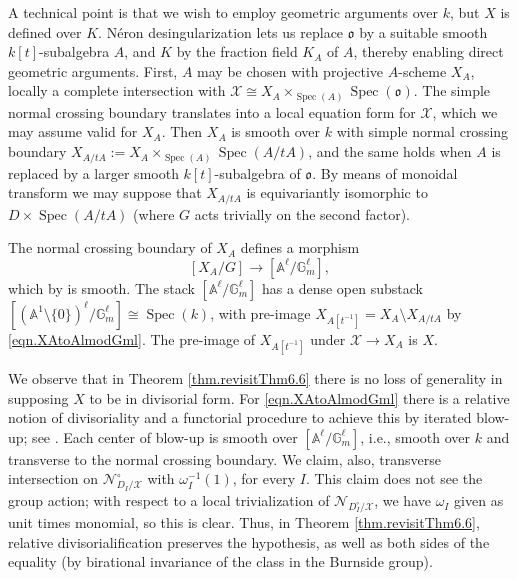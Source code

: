 \documentclass[12pt,reqno]{amsart}
\theoremstyle{plain}
\theoremstyle{remark}
\theoremstyle{definition}
\numberwithin{equation}{section}
\newcommand{\A}{{\mathbb A}}
\newcommand{\G}{{\mathbb G}}
\newcommand{\cX}{{\mathcal X}}
\DeclareMathOperator{\Spec}{Spec}
\begin{document}
A technical point is that we wish to employ geometric arguments over $k$, but $X$ is defined over $K$.
N\'eron desingularization \cite[\S 3.6]{BLR} lets us replace $\mathfrak{o}$ by a suitable smooth $k[t]$-subalgebra $A$, and $K$ by the fraction field $K_A$ of $A$, thereby enabling direct geometric arguments.
First, $A$ may be chosen with projective $A$-scheme $X_A$, locally a complete intersection with $\cX\cong X_A\times_{\Spec(A)}\Spec(\mathfrak{o})$.
The simple normal crossing boundary translates into a local equation form for $\cX$, which we may assume valid for $X_A$.
Then $X_A$ is smooth over $k$ with simple normal crossing boundary $X_{A/tA}:=X_A\times_{\Spec(A)}\Spec(A/tA)$, and
the same holds when $A$ is replaced by a larger smooth $k[t]$-subalgebra of $\mathfrak{o}$.
By means of monoidal transform we may suppose that $X_{A/tA}$ is equivariantly isomorphic to $ D\times \Spec(A/tA)$ (where $G$ acts trivially on the second factor).

The normal crossing boundary of $X_A$ defines a morphism
\begin{equation}
\label{eqn.XAtoAlmodGml}
[X_A/G]\to [\A^\ell/\G_m^\ell],
\end{equation}
which by \cite[Rmk.\ 3.4]{berghrydh} is smooth.
The stack $[\A^\ell/\G_m^\ell]$ has a dense open substack $[(\A^1\setminus \{0\})^\ell/\G_m^\ell]\cong \Spec(k)$, with
pre-image $X_{A[t^{-1}]}=X_A\setminus X_{A/tA}$ by \eqref{eqn.XAtoAlmodGml}.
The pre-image of $X_{A[t^{-1}]}$ under
$\cX\to X_A$ is $X$.

We observe that
in Theorem \ref{thm.revisitThm6.6} there is no loss of generality in supposing $X$ to be in divisorial form.
For \eqref{eqn.XAtoAlmodGml} there is a relative notion of divisoriality and a functorial procedure to achieve this by iterated blow-up; see \cite[Thm.\ 6.6]{berghrydh}.
Each center of blow-up is smooth over $[\A^\ell/\G_m^\ell]$, i.e., smooth over $k$ and transverse to the normal crossing boundary.
We claim, also, transverse intersection on $\mathcal{N}_{D_I/\cX}^\circ$ with $\omega_I^{-1}(1)$, for every $I$.
This claim does not see the group action; with respect to a local trivialization of $\mathcal{N}_{D_I^\circ/\cX}$, we have $\omega_I$ given as unit times monomial,
so this is clear.
Thus, in Theorem \ref{thm.revisitThm6.6},
relative divisorialification preserves the hypothesis, as well as both sides of the equality
(by birational invariance of the class in the Burnside group).
\end{document}
